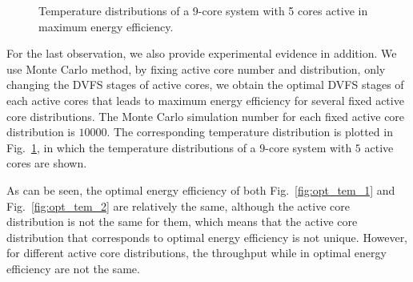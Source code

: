 \begin{figure}
  \centering
  \hspace{1ex}
  \caption{Temperature distributions of a 9-core system with 5 cores active in maximum energy efficiency.}
  \label{fig:opt_tem}
\end{figure}

For the last observation, we also provide experimental evidence in addition. We use Monte Carlo method, by fixing active core number and distribution, only changing the DVFS stages of active cores, we obtain the optimal DVFS stages of each active cores that leads to maximum energy efficiency for several fixed active core distributions. The Monte Carlo simulation number for each fixed active core distribution is $10000$. The corresponding temperature distribution is plotted in Fig.~\ref{fig:opt_tem}, in which the temperature distributions of a $9$-core system with $5$ active cores are shown. 

As can be seen, the optimal energy efficiency of both Fig.~\ref{fig:opt_tem_1} and Fig.~\ref{fig:opt_tem_2} are relatively the same, although the active core distribution is not the same for them, which means that the active core distribution that corresponds to optimal energy efficiency is not unique. However, for different active core distributions, the throughput while in optimal energy efficiency are not the same.


